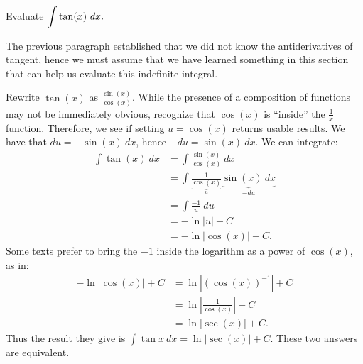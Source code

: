 \begin{example} \label{eg:4.6.usub5} %
Evaluate $\displaystyle \int \tan(x) \ dx.$

\solution
The previous paragraph established that we did not know the antiderivatives of tangent, hence we must assume that we have learned something in this section that  can help us evaluate this indefinite integral. 

Rewrite $\tan(x)$ as $\frac{\sin(x)}{\cos(x)}$. While the presence of a composition of functions may not be immediately obvious, recognize that $\cos(x)$ is ``inside'' the $\frac{1}{x}$ function. Therefore, we see if setting $u = \cos(x)$ returns usable results. We have that $du = -\sin(x) \ dx$, hence $-du = \sin(x) \ dx$. We can integrate:
\begin{align*}
\int \tan(x) \ dx &= \int \frac{\sin(x)}{\cos(x)}\ dx \\
&= \int \frac1{\underbrace{\cos(x)}_u}\underbrace{\sin(x) \ dx}_{-du} \\
&= \int \frac {-1}u \ du\\
&= -\ln |u| + C \\
&= -\ln |\cos(x)| + C.
\end{align*}
Some texts prefer to bring the $-1$ inside the logarithm as a power of $\cos(x)$, as in:
\begin{align*}
-\ln |\cos(x)| + C &= \ln |(\cos(x))^{-1}| + C\\
&= \ln \left| \frac{1}{\cos(x)}\right| + C\\
&= \ln |\sec(x)| + C.
\end{align*}
Thus the result they give is $\int \tan x \ dx = \ln|\sec(x)| + C$. These two answers are equivalent.
\end{example}